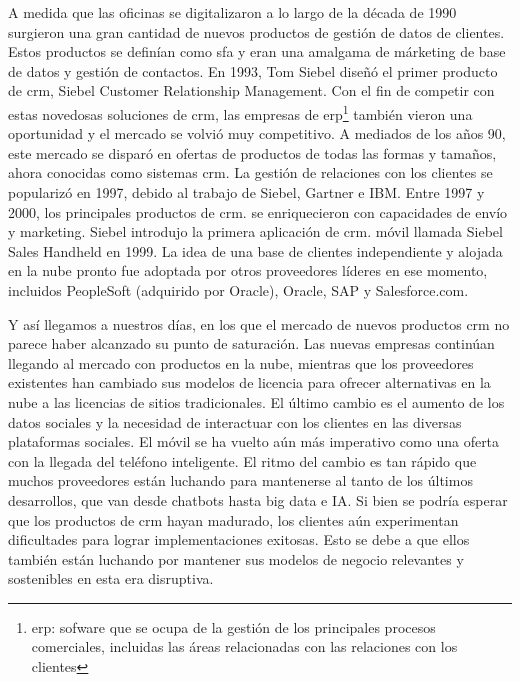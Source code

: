 A medida que las oficinas se digitalizaron a lo largo de la década de 1990 surgieron una gran cantidad de nuevos productos de gestión de datos de clientes. Estos productos se definían como \acrfull{sfa} y eran una amalgama de márketing de base de datos y gestión de contactos. En 1993, Tom Siebel diseñó el primer producto de \acrshort{crm}, Siebel Customer Relationship Management. Con el fin de competir con estas novedosas soluciones de \acrshort{crm}, las empresas de \acrfull{erp}\footnote{\acrshort{erp}: sofware que se ocupa de la gestión de los principales procesos comerciales, incluidas las áreas relacionadas con las relaciones con los clientes} también vieron una oportunidad y el mercado se volvió muy competitivo. A mediados de los años 90, este mercado se disparó en ofertas de productos de todas las formas y tamaños, ahora conocidas como sistemas \acrshort{crm}. La gestión de relaciones con los clientes se popularizó en 1997, debido al trabajo de Siebel, Gartner e IBM. Entre 1997 y 2000, los principales productos de \acrshort{crm}. se enriquecieron con capacidades de envío y marketing. Siebel introdujo la primera aplicación de \acrshort{crm}. móvil llamada Siebel Sales Handheld en 1999. La idea de una base de clientes independiente y alojada en la nube pronto fue adoptada por otros proveedores líderes en ese momento, incluidos PeopleSoft (adquirido por Oracle), Oracle, SAP y Salesforce.com.

Y así llegamos a nuestros días, en los que el mercado de nuevos productos \acrshort{crm} no parece haber alcanzado su punto de saturación. Las nuevas empresas continúan llegando al mercado con productos en la nube, mientras que los proveedores existentes han cambiado sus modelos de licencia para ofrecer alternativas en la nube a las licencias de sitios tradicionales. El último cambio es el aumento de los datos sociales y la necesidad de interactuar con los clientes en las diversas plataformas sociales. El móvil se ha vuelto aún más imperativo como una oferta con la llegada del teléfono inteligente. El ritmo del cambio es tan rápido que muchos proveedores están luchando para mantenerse al tanto de los últimos desarrollos, que van desde chatbots hasta big data e IA. Si bien se podría esperar que los productos de \acrshort{crm} hayan madurado, los clientes aún experimentan dificultades para lograr implementaciones exitosas. Esto se debe a que ellos también están luchando por mantener sus modelos de negocio relevantes y sostenibles en esta era disruptiva.
